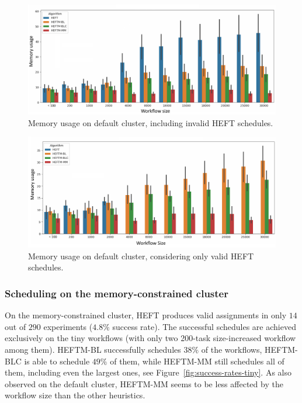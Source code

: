 \documentclass[conference]{IEEEtran}
\newcommand{\algo}[1]{\textsc{#1}}
\newcommand{\heft}{\algo{HEFT}\xspace}
\newcommand{\heftmm}{\algo{HEFTM-MM}\xspace}
\newcommand{\heftbl}{\algo{HEFTM-BL}\xspace}
\newcommand{\heftblc}{\algo{HEFTM-BLC}\xspace}
\begin{document}
\begin{figure}[tb]
    \centering
    \includegraphics[width=1\columnwidth] {images/mem-usage-normal2}
    \caption{Memory usage on default cluster, including invalid \heft schedules. }
     \label{fig:mem-usages-normal}
\end{figure}


\begin{figure}[tb]
    \centering
    \includegraphics[width=1\columnwidth] {images/mem-usage-normal-onlyvalid2}
    \caption{Memory usage on default cluster, considering only valid \heft schedules. }
    \label{fig:mem-usages-onlyvalid}
\end{figure}


\medskip
\subsubsection{Scheduling on the memory-constrained cluster}
\label{ss:mem-constrained-cluster}
%
On the memory-constrained cluster, \heft produces valid assignments in only $14$ out of $290$ experiments ($4.8\%$ success rate).
The successful schedules are achieved exclusively on the tiny workflows (with only two 200-task size-increased
workflow among them).
\heftbl successfully schedules $38\%$ of the workflows, \heftblc is able to schedule $49\%$ of them, while \heftmm
still schedules all of them, including even the largest ones, see Figure~\ref{fig:success-rates-tiny}.
As also observed on the default cluster, \heftmm seems to be less affected by the workflow size
than the other heuristics.
\end{document}
